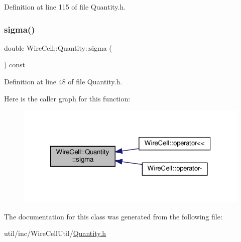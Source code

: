 Definition at line 115 of file Quantity.\+h.

\mbox{\label{class_wire_cell_1_1_quantity_a0971c6bc040bd7b9a48ae556cdcf3c85}} 
\subsubsection{\texorpdfstring{sigma()}{sigma()}}
{\footnotesize\ttfamily double Wire\+Cell\+::\+Quantity\+::sigma (\begin{DoxyParamCaption}{ }\end{DoxyParamCaption}) const\hspace{0.3cm}{\ttfamily [inline]}}



Definition at line 48 of file Quantity.\+h.

Here is the caller graph for this function\+:
\nopagebreak
\begin{figure}[H]
\begin{center}
\leavevmode
\includegraphics[width=320pt]{class_wire_cell_1_1_quantity_a0971c6bc040bd7b9a48ae556cdcf3c85_icgraph}
\end{center}
\end{figure}


The documentation for this class was generated from the following file\+:\begin{DoxyCompactItemize}
\item 
util/inc/\+Wire\+Cell\+Util/\hyperlink{_quantity_8h}{Quantity.\+h}\end{DoxyCompactItemize}
